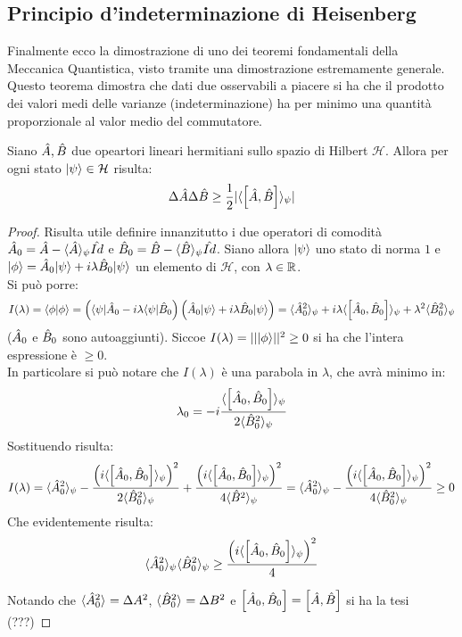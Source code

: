 \subsection{Principio d'indeterminazione di Heisenberg}
Finalmente ecco la dimostrazione di uno dei teoremi fondamentali della Meccanica Quantistica, visto tramite una dimostrazione estremamente generale.\\
Questo teorema dimostra che dati due osservabili a piacere si ha che il prodotto dei valori medi delle varianze (indeterminazione) ha per minimo una quantità proporzionale al valor medio del commutatore.
\begin{teorema}
	Siano $\A, \B$ due opeartori lineari hermitiani sullo spazio di Hilbert $\mathcal{H}$. Allora per ogni stato $\Ket \psi \in \mathcal{H}$ risulta:
	\[
		\Delta \A \Delta \B \geq \half \abs{\avg[\psi]{\comm{\A}{\B}}}
	\]
\end{teorema}
\begin{proof}
	Risulta utile definire innanzitutto i due operatori di comodità $\A_0 = \A - \avg[\psi]{\A}\Id$ e $\B_0 = \B - \avg[\psi]{\B}\Id$. Siano allora $\Ket\psi$ uno stato di norma $1$ e $\Ket \phi = \A_0\Ket \psi + i \lambda \B_0\Ket \psi$ un elemento di $\mathcal H$, con $\lambda \in \R$.\\
	Si può porre:
	\[
		I(\lambda) = \braket{\phi}{\phi} = \l\Bra \psi \A_0 - i \lambda \Bra \psi \B_0\r\l\A_0\Ket \psi + i \lambda \B_0\Ket \psi\r = \avg[\psi]{\A_0^2} + i\lambda\avg[\psi]{\comm{\A_0}{\B_0}} + \lambda^2\avg[\psi]{\B_0^2}
	\]
	($\A_0$ e $\B_0$ sono autoaggiunti). Siccoe $I(\lambda) = \vabs{\Ket \phi}^2 \geq 0$ si ha che l'intera espressione è $\geq 0$.\\
	In particolare si può notare che $I(\lambda)$ è una parabola in $\lambda$, che avrà minimo in:
	\[
		\lambda_0 = -i\frac{\avg[\psi]{\comm{\A_0}{\B_0}} }{2\avg[\psi]{\B_0^2}}
	\]
	Sostituendo risulta:
	\[
		I(\lambda) = \avg[\psi]{\A_0^2} - \frac{\l i\avg[\psi]{\comm{\A_0}{\B_0}}\r^2}{2\avg[\psi]{\B_0^2}} + \frac{\l i\avg[\psi]{\comm{\A_0}{\B_0}}\r^2}{4\avg[\psi]{\B^2}} = \avg[\psi]{\A_0^2} - \frac{\l i\avg[\psi]{\comm{\A_0}{\B_0}}\r^2}{4\avg[\psi]{\B_0^2}} \geq 0
	\]
	Che evidentemente risulta:
	\[
		\avg[\psi]{\A_0^2}\avg[\psi]{\B_0^2} \geq \frac{\l i\avg[\psi]{\comm{\A_0}{\B_0}}\r^2}{4}
	\]

	Notando che $\avg {\A_0^2} = \Delta A^2$, $\avg {\B_0^2} = \Delta B^2$ e $\comm{\A_0}{\B_0} = \comm{\A}{\B}$ si ha la tesi (???)
\end{proof}